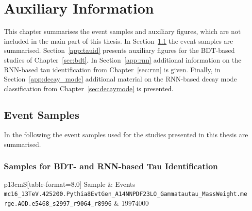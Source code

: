 \chapter{Auxiliary Information}
\label{sec:app}

This chapter summarises the event samples and auxiliary figures, which are not
included in the main part of this thesis. In Section~\ref{app:samples} the event
samples are summarised. Section~\ref{app:tauid} presents auxiliary figures for
the BDT-based studies of Chapter~\ref{sec:bdt}. In Section~\ref{app:rnn}
additional information on the RNN-based tau identification from
Chapter~\ref{sec:rnn} is given. Finally, in Section~\ref{app:decay_mode}
additional material on the RNN-based decay mode classification from
Chapter~\ref{sec:decaymode} is presented.

\section{Event Samples}
\label{app:samples}

In the following the event samples used for the studies presented in this thesis
are summarised.

\subsection{Samples for BDT- and RNN-based Tau Identification}
\label{app:preprod_taus}
\label{app:preprod_dijets}

\noindent
\begin{minipage}{\textwidth}
  \captionsetup{type=table}
  \centering
  {\small
  \begin{tabular}{p{13cm}S[table-format=8.0]}
    \toprule
    Sample & {Events} \\
    \midrule
    \texttt{mc16\_13TeV.425200.Pythia8EvtGen\_A14NNPDF23LO\_Gammatautau\_MassWeight\newline\hspace*{1em}.merge.AOD.e5468\_s2997\_r9064\_r8996} & 19974000 \\
    \bottomrule
  \end{tabular}
  }
  \caption[Signal samples used for the BDT- and RNN-based tau
  identification]{Signal samples ($\gamma^* \to \tauhad\tauhad$) used for the
    BDT- and RNN-based tau identification}
  \label{tab:samples_preprod_taus}
\end{minipage}

